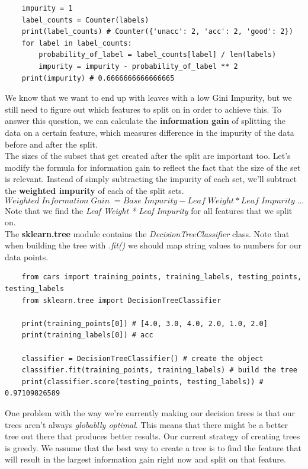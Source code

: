 \documentclass[11pt, a4paper]{article}
\begin{document}
\begin{spacing}{1.1}
\begin{lstlisting}
	impurity = 1
	label_counts = Counter(labels)
	print(label_counts) # Counter({'unacc': 2, 'acc': 2, 'good': 2})
	for label in label_counts:
		probability_of_label = label_counts[label] / len(labels)
		impurity = impurity - probability_of_label ** 2
	print(impurity) # 0.6666666666666665 \end{lstlisting} \vspace*{1mm}
	We know that we want to end up with leaves with a low Gini Impurity, but we still need to figure out which features to split on in order to achieve this. To answer this question, we can calculate the \textbf{information gain} of splitting the data on a certain feature, which measures difference in the impurity of the data before and after the split. \vspace*{2mm} \\
	The sizes of the subset that get created after the split are important too. Let’s modify the formula for information gain to reflect the fact that the size of the set is relevant. Instead of simply subtracting the impurity of each set, we’ll subtract the \textbf{weighted impurity} of each of the split sets. $$ Weighted\; Information\; Gain\; = Base\; Impurity - Leaf\; Weight * Leaf\; Impurity\; ... $$ Note that we find the \textit{Leaf Weight * Leaf Impurity} for all features that we split on. \vspace*{2mm} \\
	The \textbf{sklearn.tree} module contains the \textit{DecisionTreeClassifier} class. Note that when building the tree with \textit{.fit()} we should map string values to numbers for our data points. 
	\begin{lstlisting}
	from cars import training_points, training_labels, testing_points, testing_labels
	from sklearn.tree import DecisionTreeClassifier
	
	print(training_points[0]) # [4.0, 3.0, 4.0, 2.0, 1.0, 2.0]
	print(training_labels[0]) # acc
	
	classifier = DecisionTreeClassifier() # create the object
	classifier.fit(training_points, training_labels) # build the tree
	print(classifier.score(testing_points, testing_labels)) # 0.97109826589	\end{lstlisting} \vspace*{1mm}
	One problem with the way we’re currently making our decision trees is that our trees aren’t always \textit{globablly optimal}. This means that there might be a better tree out there that produces better results. Our current strategy of creating trees is greedy. We assume that the best way to create a tree is to find the feature that will result in the largest information gain right now and split on that feature. \newpage


\end{spacing}
\end{document}
